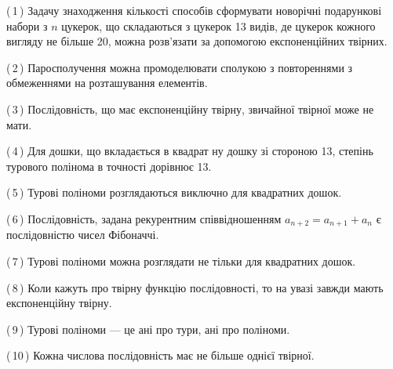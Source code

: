 \documentclass[12pt, ukrainian]{article}
\begin{document}
\begin {large}
\begin {large}
\begin {large}
\begin {large}
\begin {large}
\begin {large}
\begin {large}
\begin {large}
\begin {large}
\begin {large}
\begin {large}
\begin {large}
\begin {large}
\begin {large}
\begin {large}
\begin {large}
\begin {large}
\begin {large}
\begin {large}
\begin {large}
\begin {large}
\begin {large}
\begin {large}
\begin {large}
\begin {large}
\begin {large}
\begin {large}
\begin {large}
\begin {large}
\begin {large}
\begin {large}
\begin {large}
\begin {large}
\begin {large}
\begin {large}
\begin {large}
\begin {large}
\begin {large}
\begin {large}
\begin {large}
\begin {large}
\begin {large}
\begin {large}
\begin {large}
\begin {large}
{(\,1\,) Задачу знаходження кількості способів сформувати новорічні подарункові набори з $n$ цукерок, що складаються з цукерок 13 видів, де цукерок кожного вигляду не більше 20, можна розв’язати за допомогою експоненційних твірних.%



(\,2\,) Паросполучення можна промоделювати сполукою з повтореннями з обмеженнями на розташування елементів.%



(\,3\,) Послідовність, що має експоненційну твірну, звичайної твірної може не мати.%



(\,4\,) Для дошки, що вкладається в квадрат ну дошку зі стороною 13, степінь турового полінома в точності дорівнює 13.%



(\,5\,) Турові поліноми розглядаються виключно для квадратних дошок.%



(\,6\,) Послідовність, задана рекурентним співвідношенням $a_{n+2}=a_{n+1}+a_{n}$ є послідовністю чисел Фібоначчі.%



(\,7\,) Турові поліноми можна розглядати не тільки для квадратних дошок.%



(\,8\,) Коли кажуть про твірну функцію послідовності, то на увазі завжди мають експоненційну твірну.%



(\,9\,) Турові поліноми --- це ані про тури, ані про поліноми.%



(\,10\,) Кожна числова послідовність має не більше однієї твірної.%




\vspace{5mm}
}
\newpage

\begin {large}


\end{large}
\end{large}
\end{large}
\end{large}
\end{large}
\end{large}
\end{large}
\end{large}
\end{large}
\end{large}
\end{large}
\end{large}
\end{large}
\end{large}
\end{large}
\end{large}
\end{large}
\end{large}
\end{large}
\end{large}
\end{large}
\end{large}
\end{large}
\end{large}
\end{large}
\end{large}
\end{large}
\end{large}
\end{large}
\end{large}
\end{large}
\end{large}
\end{large}
\end{large}
\end{large}
\end{large}
\end{large}
\end{large}
\end{large}
\end{large}
\end{large}
\end{large}
\end{large}
\end{large}
\end{large}
\end{large}
\end{document}
